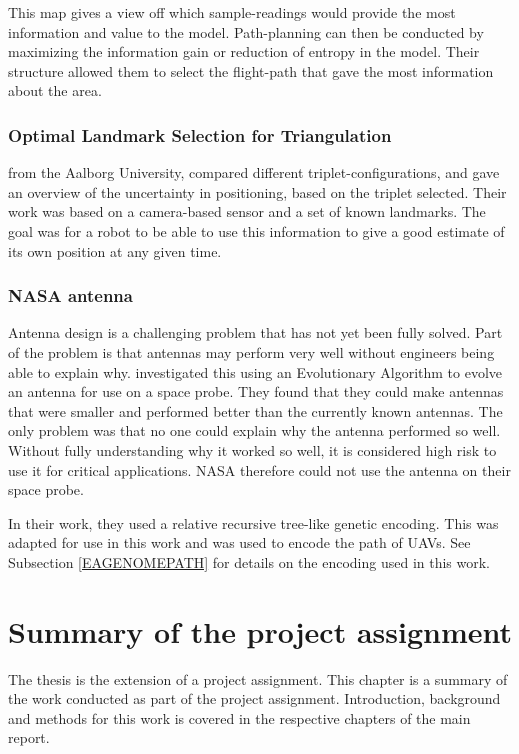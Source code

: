 \documentclass[10pt,a4paper]{book}
\begin{document}
This map gives a view off which sample-readings would provide the most information and value to the model. Path-planning can then be conducted by maximizing the information gain or reduction of entropy in the model. Their structure allowed them to select the flight-path that gave the most information about the area.


\subsection{Optimal Landmark Selection for Triangulation}

\citet{madsen1998optimal} from the Aalborg University, compared different triplet-configurations, and gave an overview of the uncertainty in positioning, based on the triplet selected. Their work was based on a camera-based sensor and a set of known landmarks. The goal was for a robot to be able to use this information to give a good estimate of its own position at any given time.

\subsection{NASA antenna}

Antenna design is a challenging problem that has not yet been fully solved. Part of the problem is that antennas may perform very well without engineers being able to explain why. \citet{hornby2006automated} investigated this using an Evolutionary Algorithm to evolve an antenna for use on a space probe. They found that they could make antennas that were smaller and performed better than the currently known antennas. The only problem was that no one could explain why the antenna performed so well. Without fully understanding why it worked so well, it is considered high risk to use it for critical applications. NASA therefore could not use the antenna on their space probe. 

In their work, they used a relative recursive tree-like genetic encoding. This was adapted for use in this work and was used to encode the path of \glspl{UAV}. See Subsection \ref{EAGENOMEPATH} for details on the encoding used in this work. 



\chapter{Summary of the project assignment}

The thesis is the extension of a project assignment. This chapter is a summary of the work conducted as part of the project assignment. Introduction, background and methods for this work is covered in the respective chapters of the main report.
\newpage
\end{document}

